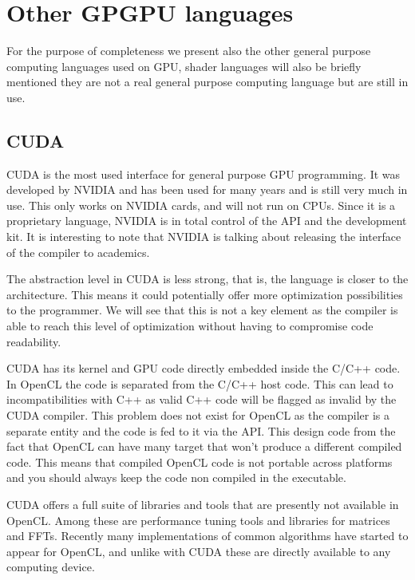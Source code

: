 \section{Other GPGPU languages}

For the purpose of completeness we present also the other general purpose computing languages used on \gls{GPU}, shader languages will also be briefly mentioned they are not a real general purpose computing language but are still in use.

\subsection{CUDA}

\Gls{CUDA} is the most used interface for general purpose \gls{GPU} programming. It was developed by NVIDIA and has been used for many years and is still very much in use. This only works on NVIDIA cards, and will not run on \glspl{CPU}. Since it is a proprietary language, NVIDIA is in total control of the API and the development kit. It is interesting to note that NVIDIA is talking about releasing the interface of the compiler to academics.

The abstraction level in \gls{CUDA} is less strong, that is, the language is closer to the architecture. This means it could potentially offer more optimization possibilities to the programmer. We will see that this is not a key element as the compiler is able to reach this level of optimization without having to compromise code readability.

\Gls{CUDA} has its kernel and \gls{GPU} code directly embedded inside the C/C++ code. In \gls{OpenCL} the code is separated from the C/C++ host code. This can lead to incompatibilities with C++ as valid C++ code will be flagged as invalid by the \gls{CUDA} compiler. This problem does not exist for \gls{OpenCL} as the compiler is a separate entity and the code is fed to it via the \gls{API}. This design code from the fact that \gls{OpenCL} can have many target that won't produce a different compiled code. This means that compiled \gls{OpenCL} code is not portable across platforms and you should always keep the code non compiled in the executable.

\Gls{CUDA} offers a full suite of libraries and tools that are presently not available in \gls{OpenCL}. Among these are performance tuning tools and libraries for matrices and \glspl{FFT}. Recently many implementations of common algorithms have started to appear for \gls{OpenCL}, and unlike with \gls{CUDA} these are directly available to any computing device.

